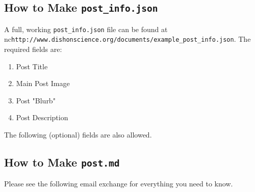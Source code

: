 \documentclass[paper=a4, fontsize=11pt]{scrartcl}
\numberwithin{equation}{section}        %
\numberwithin{figure}{section}            %
\numberwithin{table}{section}                %
\begin{document}
\subsection{How to Make \texttt{\textbf{post\_info.json}}}
A full, working \texttt{post\_info.json} file can be found at
nc\texttt{http://www.dishonscience.org/documents/example\_post\_info.json}.
The required fields are:\@
\begin{enumerate}
    \item Post Title
    \item Main Post Image
    \item Post "Blurb"
    \item Post Description
\end{enumerate}

The following (optional) fields are also allowed.


\subsection{How to Make \texttt{\textbf{post.md}}}
Please see the following email exchange for everything you need to know.
\end{document}
